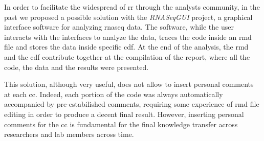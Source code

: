 In order to facilitate the widespread of \gls{rr} through the analysts community, in the past we proposed a possible solution with the \textit{RNASeqGUI} \cite{russo2015advantages} project, a graphical interface software for analyzing \gls{rnaseq} data.
The software, while the user interacts with the interfaces to analyze the data, traces the code inside an \gls{rmd} file and stores the data inside specific \gls{cdf}.
At the end of the analysis, the \gls{rmd} and the \gls{cdf} contribute together at the compilation of the report, where all the code, the data and the results were presented.

This solution, although very useful, does not allow to insert personal comments at each \gls{cc}.
Indeed, each portion of the code was always automatically accompanied by pre-estabilished comments, requiring some experience of \gls{rmd} file editing in order to produce a decent final result.
However, inserting personal comments for the \gls{cc} is fundamental for the final knowledge transfer across researchers and lab members across time.


